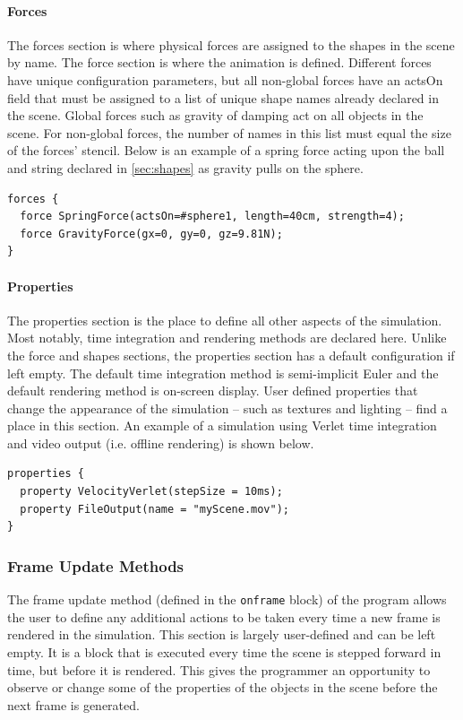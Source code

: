 \paragraph{Forces}

The forces section is where physical forces are assigned to the shapes
in the scene by name. The force section is where the animation is
defined. Different forces have unique configuration parameters, but
all non-global forces have an actsOn field that must be assigned to a
list of unique shape names already declared in the scene. Global
forces such as gravity of damping act on all objects in the scene. For
non-global forces, the number of names in this list must equal the
size of the forces' stencil. Below is an example of a spring force
acting upon the ball and string declared in \ref{sec:shapes} as
gravity pulls on the sphere.

\begin{verbatim}
forces {
  force SpringForce(actsOn=#sphere1, length=40cm, strength=4);
  force GravityForce(gx=0, gy=0, gz=9.81N);
}
\end{verbatim}
 
\paragraph{Properties}

The properties section is the place to define all other aspects of the
simulation. Most notably, time integration and rendering methods are
declared here. Unlike the force and shapes sections, the properties
section has a default configuration if left empty. The default time
integration method is semi-implicit Euler and the default rendering
method is on-screen display. User defined properties that change the
appearance of the simulation -- such as textures and lighting -- find a
place in this section. An example of a simulation using Verlet
time integration and video output (i.e. offline rendering) is shown
below.

\begin{verbatim}
properties {
  property VelocityVerlet(stepSize = 10ms);
  property FileOutput(name = "myScene.mov");
}
\end{verbatim}
 
\subsubsection{Frame Update Methods}
The frame update method (defined in the \texttt{onframe} block) of the
program allows the user to define any additional actions to be taken
every time a new frame is rendered in the simulation. This section is
largely user-defined and can be left empty. It is a block that is
executed every time the scene is stepped forward in time, but before
it is rendered. This gives the programmer an opportunity to observe or
change some of the properties of the objects in the scene before the
next frame is generated.


